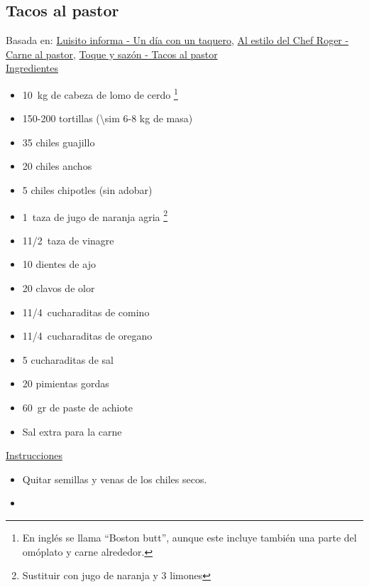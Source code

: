 \subsection{Tacos al pastor}

Basada en: \href{https://www.youtube.com/watch?v=W03EIyBCOPI&list=LL70vwP7i8PV9gx3t6SvBbRQ&index=598}{Luisito informa - Un día con un taquero}, \href{https://www.youtube.com/watch?v=F7N3l6XGn-0}{Al estilo del Chef Roger - Carne al pastor},
\href{https://www.youtube.com/watch?v=pmzl92R3rJk}{Toque y sazón - Tacos al pastor}\\

\underline{Ingredientes}

\begin{itemize}
\item \SI{10}{kg} de cabeza de lomo de cerdo \footnote{En inglés se llama ``Boston butt'', aunque este incluye también una parte del omóplato y carne alrededor.}
\item 150-200 tortillas (\num{\sim 6}-8 kg de masa)
\item 35 chiles guajillo
\item 20 chiles anchos
\item 5 chiles chipotles (sin adobar)
\item \SI{1}{taza} de jugo de naranja agria \footnote{Sustituir con jugo de naranja y 3 limones}
\item 1\SI{1/2}{taza} de vinagre
\item 10 dientes de ajo
\item 20 clavos de olor
\item 1\SI{1/4}{cucharaditas} de comino
\item 1\SI{1/4}{cucharaditas} de oregano
\item 5 cucharaditas de sal
\item 20 pimientas gordas
\item \SI{60}{gr} de paste de achiote
\item Sal extra para la carne
\end{itemize}

\underline{Instrucciones}
\begin{itemize}
\item Quitar semillas y venas de los chiles secos.
\item 
\end{itemize}


